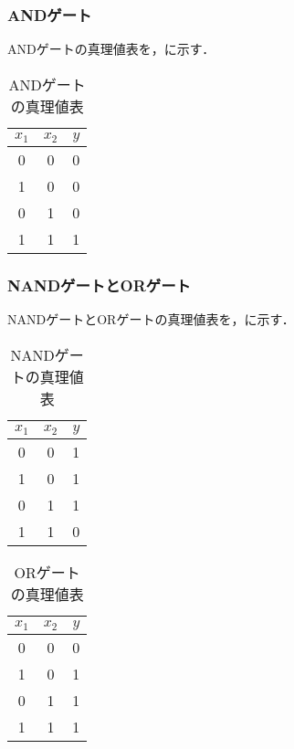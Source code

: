 \subsubsection{ANDゲート}
ANDゲートの真理値表を，に示す．
\begin{table}[htb]
    \centering
    \begin{tabular}{ccc}
        $x_1$ & $x_2$ & $y$ \\  %
        \hline
        \hline
        0 & 0 & 0 \\  %
        \midrule
        1 & 0 & 0 \\  %
        \midrule  %
        0 & 1 & 0 \\ 
        \midrule  %
        1 & 1 & 1 \\
        \end{tabular}
    \caption{ANDゲートの真理値表}
    \label{tab:2_AND}
\end{table}

\subsubsection{NANDゲートとORゲート}
NANDゲートとORゲートの真理値表を，に示す．
\begin{table}[htb]
    \centering
    \begin{tabular}{ccc}
        $x_1$ & $x_2$ & $y$ \\  %
        \hline
        \hline
        0 & 0 & 1 \\  %
        \midrule
        1 & 0 & 1 \\  %
        \midrule  %
        0 & 1 & 1 \\ 
        \midrule  %
        1 & 1 & 0 \\
        \end{tabular}
    \caption{NANDゲートの真理値表}
    \label{tab:2_NAND}
\end{table}

\begin{table}[htb]
    \centering
    \begin{tabular}{ccc}
        $x_1$ & $x_2$ & $y$ \\  %
        \hline
        \hline
        0 & 0 & 0 \\  %
        \midrule
        1 & 0 & 1 \\  %
        \midrule  %
        0 & 1 & 1 \\ 
        \midrule  %
        1 & 1 & 1 \\
        \end{tabular}
    \caption{ORゲートの真理値表}
    \label{tab:2_OR}
\end{table}

